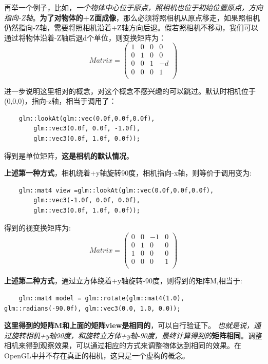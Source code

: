 \documentclass[UTF8,a4paper,8pt]{ctexbook}
\begin{document}
				再举一个例子，比如，\textit{一个物体中心位于原点，照相机也位于初始位置原点，方向指向-Z轴}。\textbf{为了对物体的+Z面成像}，那么必须将照相机从原点移走，如果照相机仍然指向-Z轴，需要将照相机沿着+Z轴方向后退。假若照相机不移动，我们可以通过将物体沿着-Z轴后退d个单位，则变换矩阵为：
					$$
					Matrix = 
					\left(
					\begin{array}{cccc}
					1 & 0 & 0& 0\\
					
					0 & 1 & 0& 0\\
					
					0 & 0 & 1& -d\\
					
					0 & 0 & 0& 1\\
					\end{array}
					\right)
					$$
					
			进一步说明这里相对的概念，对这个概念不感兴趣的可以跳过。默认时相机位于(0,0,0)，指向-z轴，相当于调用了：
			\begin{lstlisting}
	glm::lookAt(glm::vec(0.0f,0.0f,0.0f),
		glm::vec3(0.0f, 0.0f, -1.0f),
		glm::vec3(0.0f, 1.0f, 0.0f));
			\end{lstlisting}
			得到是单位矩阵，\textbf{这是相机的默认情况}。
			
			\textbf{上述第一种方式}，相机绕着+y轴旋转90度，相机指向-x轴，则等价于调用变为:
			\begin{lstlisting}
	glm::mat4 view =glm::lookAt(glm::vec(0.0f,0.0f,0.0f),
		glm::vec3(-1.0f, 0.0f, 0.0f),
		glm::vec3(0.0f, 1.0f, 0.0f));
			\end{lstlisting}
			得到的视变换矩阵为:
				$$
				Matrix = 
				\left(
				\begin{array}{cccc}
				0 & 0 & -1& 0\\
				
				0 & 1 & 0& 0\\
				
				1 & 0 & 0& 0\\
				
				0 & 0 & 0& 1\\
				\end{array}
				\right)
				$$
			
			\textbf{上述第二种方式}，通过立方体绕着+y轴旋转-90度，则得到的矩阵M,相当于:
				\begin{lstlisting}
	glm::mat4 model = glm::rotate(glm::mat4(1.0), glm::radians(-90.0f), glm::vec3(0.0, 1.0, 0.0));
				\end{lstlisting}
				
			\textbf{这里得到的矩阵M和上面的矩阵view是相同的}，可以自行验证下。 
			\textit{也就是说，通过旋转相机+y轴90度，和旋转立方体+y轴-90度，最终计算得到的}\textbf{矩阵相同}。调整相机来得到观察效果，可以通过相应的方式来调整物体达到相同的效果。在OpenGL中并不存在真正的相机，这只是一个虚构的概念。
			
\end{document}
